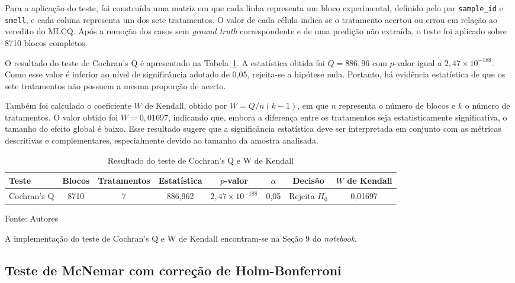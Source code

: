 Para a aplicação do teste, foi construída uma matriz em que cada linha representa um bloco experimental, definido pelo par \texttt{sample\_id} e \texttt{smell}, 
e cada coluna representa um dos sete tratamentos. O valor de cada célula indica se o tratamento acertou ou errou em relação ao veredito do MLCQ. 
Após a remoção dos casos sem \textit{ground truth} correspondente e de uma predição não extraída, o teste foi aplicado sobre 8710 blocos completos.

O resultado do teste de Cochran's Q é apresentado na Tabela~\ref{tab:resultado-cochran-kendall}. A estatística obtida foi $Q = 886{,}96$ com $p$-valor igual a $2{,}47 \times 10^{-188}$. Como esse valor é inferior 
ao nível de significância adotado de 0,05, rejeita-se a hipótese nula. Portanto, há evidência estatística de que os sete tratamentos não possuem a mesma proporção de acerto.

Também foi calculado o coeficiente $W$ de Kendall, obtido por $W = Q / n(k-1)$, em que $n$ representa o número de blocos e $k$ o número de tratamentos. 
O valor obtido foi $W = 0{,}01697$, indicando que, embora a diferença entre os tratamentos seja estatisticamente significativa, o tamanho do efeito global é baixo. 
Esse resultado sugere que a significância estatística deve ser interpretada em conjunto com as métricas descritivas e complementares, especialmente 
devido ao tamanho da amostra analisada.

\begin{table}[H]
\centering
\caption{Resultado do teste de Cochran's Q e W de Kendall}
\label{tab:resultado-cochran-kendall}
\begin{tabular}{lccccccc}
\hline
Teste & Blocos & Tratamentos & Estatística & $p$-valor & $\alpha$ & Decisão & $W$ de Kendall \\
\hline
Cochran's Q & 8710 & 7 & 886,962 & $2{,}47 \times 10^{-188}$ & 0,05 & Rejeita $H_0$ & 0,01697 \\
\hline
\end{tabular}

Fonte: Autores
\end{table}

A implementação do teste de Cochran's Q e W de Kendall encontram-se na Seção 9 do \textit{notebook}.

\subsection{Teste de McNemar com correção de Holm-Bonferroni}

